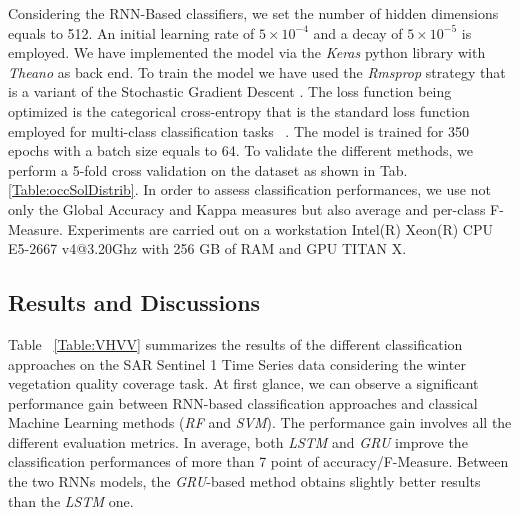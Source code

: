 \documentclass[journal, onecolumn]{IEEEtran}
\begin{document}
Considering the RNN-Based classifiers, we set the number of hidden dimensions equals to 512. An initial learning rate of $5 \times 10^{-4}$ and a decay of $5 \times 10^{-5}$ is employed. We have implemented the model via the \textit{Keras} python library  \cite{chollet2015} with \textit{Theano} as back end. 
To train the model we have used the \textit{Rmsprop} strategy that is a variant of the Stochastic Gradient Descent \cite{DauphinVCB15}. The loss function being optimized is the categorical cross-entropy that is the standard loss function employed for multi-class classification tasks ~\cite{Zhang16}. The model is trained for 350 epochs with a batch size equals to 64. To validate the different methods, we perform a 5-fold cross validation on the dataset as shown in Tab. \ref{Table:occSolDistrib}.  In order to assess classification performances, we use not only the Global Accuracy and Kappa measures but also average and per-class F-Measure. Experiments are carried out on a workstation Intel(R) Xeon(R) CPU E5-2667 v4@3.20Ghz with 256 GB of RAM and GPU TITAN X.



\subsection{Results and Discussions}
Table ~\ref{Table:VHVV} summarizes the results of the different classification approaches on the SAR Sentinel 1 Time Series data considering the winter vegetation quality coverage task. 
At first glance, we can observe a significant performance gain between RNN-based classification approaches and classical Machine Learning methods (\textit{RF} and \textit{SVM}). The performance gain involves all the different evaluation metrics. In average, both \textit{LSTM} and \textit{GRU} improve the classification performances of more than 7 point of accuracy/F-Measure. Between the two RNNs models, the \textit{GRU}-based method obtains slightly better results than the \textit{LSTM} one.
\end{document}
